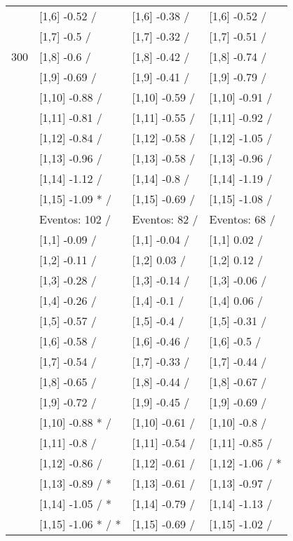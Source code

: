 \begin{table}
\begin{tabular}[t]{llll}
 & {}[1,6] -0.52  / & {}[1,6] -0.38  / & {}[1,6] -0.52  /\\
 & {}[1,7] -0.5  / & {}[1,7] -0.32  / & {}[1,7] -0.51  /\\
300 & {}[1,8] -0.6  / & {}[1,8] -0.42  / & {}[1,8] -0.74  /\\
\addlinespace
 & {}[1,9] -0.69  / & {}[1,9] -0.41  / & {}[1,9] -0.79  /\\
 & {}[1,10] -0.88  / & {}[1,10] -0.59  / & {}[1,10] -0.91  /\\
 & {}[1,11] -0.81  / & {}[1,11] -0.55  / & {}[1,11] -0.92  /\\
 & {}[1,12] -0.84  / & {}[1,12] -0.58  / & {}[1,12] -1.05  /\\
 & {}[1,13] -0.96  / & {}[1,13] -0.58  / & {}[1,13] -0.96  /\\
\addlinespace
 & {}[1,14] -1.12  / & {}[1,14] -0.8  / & {}[1,14] -1.19  /\\
 & {}[1,15] -1.09 * / & {}[1,15] -0.69  / & {}[1,15] -1.08  /\\
 & Eventos:  102 / & Eventos:  82 / & Eventos:  68 /\\
 & {}[1,1] -0.09  / & {}[1,1] -0.04  / & {}[1,1] 0.02  /\\
 & {}[1,2] -0.11  / & {}[1,2] 0.03  / & {}[1,2] 0.12  /\\
\addlinespace
 & {}[1,3] -0.28  / & {}[1,3] -0.14  / & {}[1,3] -0.06  /\\
 & {}[1,4] -0.26  / & {}[1,4] -0.1  / & {}[1,4] 0.06  /\\
 & {}[1,5] -0.57  / & {}[1,5] -0.4  / & {}[1,5] -0.31  /\\
 & {}[1,6] -0.58  / & {}[1,6] -0.46  / & {}[1,6] -0.5  /\\
 & {}[1,7] -0.54  / & {}[1,7] -0.33  / & {}[1,7] -0.44  /\\
\addlinespace
500 & {}[1,8] -0.65  / & {}[1,8] -0.44  / & {}[1,8] -0.67  /\\
 & {}[1,9] -0.72  / & {}[1,9] -0.45  / & {}[1,9] -0.69  /\\
 & {}[1,10] -0.88 * / & {}[1,10] -0.61  / & {}[1,10] -0.8  /\\
 & {}[1,11] -0.8  / & {}[1,11] -0.54  / & {}[1,11] -0.85  /\\
 & {}[1,12] -0.86  / & {}[1,12] -0.61  / & {}[1,12] -1.06  / *\\
\addlinespace
 & {}[1,13] -0.89  / * & {}[1,13] -0.61  / & {}[1,13] -0.97  /\\
 & {}[1,14] -1.05  / * & {}[1,14] -0.79  / & {}[1,14] -1.13  /\\
 & {}[1,15] -1.06 * / * & {}[1,15] -0.69  / & {}[1,15] -1.02  /\\
\bottomrule
\end{tabular}
\end{table}
